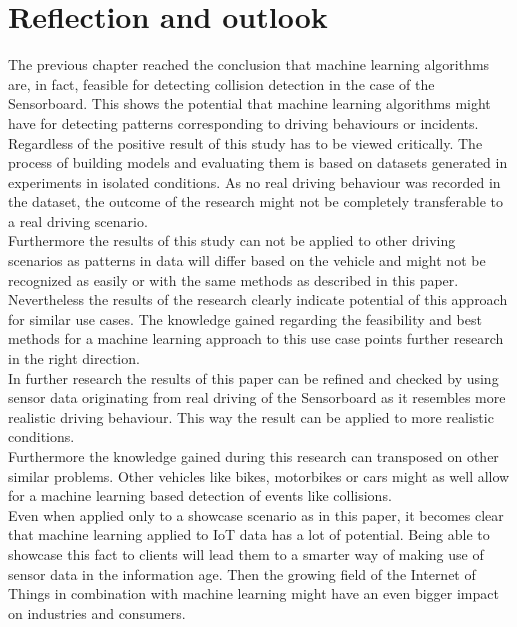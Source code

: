 \chapter{Reflection and outlook}
The previous chapter reached the conclusion that machine learning algorithms are, in fact, feasible for detecting collision detection in the case of the Sensorboard. This shows the potential that machine learning algorithms might have for detecting patterns corresponding to driving behaviours or incidents.
\\
Regardless of the positive result of this study has to be viewed critically. The process of building models and evaluating them is based on datasets generated in experiments in isolated conditions. As no real driving behaviour was recorded in the dataset, the outcome of the research might not be completely transferable to a real driving scenario. \\
Furthermore the results of this study can not be applied to other driving scenarios as patterns in data will differ based on the vehicle and might not be recognized as easily or with the same methods as described in this paper.
\\
Nevertheless the results of the research clearly indicate potential of this approach for similar use cases. The knowledge gained regarding the feasibility and best methods for a machine learning approach to this use case points further research in the right direction.
\\
In further research the results of this paper can be refined and checked by using sensor data originating from real driving of the Sensorboard as it resembles more realistic driving behaviour. This way the result can be applied to more realistic conditions. 
\\
Furthermore the knowledge gained during this research can transposed on other similar problems. Other vehicles like bikes, motorbikes or cars might as well allow for a machine learning based detection of events like collisions. 
\\
Even when applied only to a showcase scenario as in this paper, it becomes clear that machine learning applied to IoT data has a lot of potential. Being able to showcase this fact to clients will lead them to a smarter way of making use of sensor data in the information age. Then the growing field of the Internet of Things in combination with machine learning might have an even bigger impact on industries and consumers.